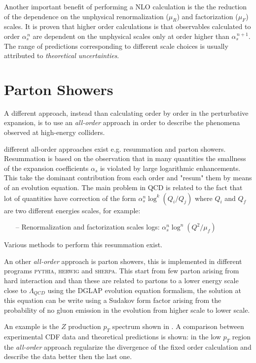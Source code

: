 Another important benefit of performing a NLO calculation is the the reduction of the dependence on the unphysical renormalization ($\mu_R$) and factorization ($\mu_F$) scales.
It is proven that higher order calculations is that observables calculated to order $\alpha_s^{\,n}$ are dependent on the unphysical scales only at order higher than $\alpha_s^{\,n+1}$. The range of predictions corresponding to different scale choices is usually attributed to \textit{theoretical uncertainties}.

\section{Parton Showers}

A different approach, instead than calculating order by order in the perturbative expansion, is to use an \textit{all-order} approach in order to describe the phenomena observed at high-energy colliders. 

different all-order approaches exist e.g. resummation and parton showers. Resummation is based on the observation that in many quantities the smallness of the expansion coefficients $\alpha_s$ is violated by large logarithmic enhancements. This take the dominant contribution from each order and "resum" them by means of an evolution equation. 
The main problem in QCD is related to the fact that lot of quantities have correction of the form $\alpha_s^n\log^k(Q_i/Q_j)$ where $Q_i$ and $Q_f$ are two different energies scales, for example:
\begin{itemize}
	\item[--] Renormalization and factorization scales logs: $\alpha_s^n\log^n(Q^2/\mu_f)$
\end{itemize}
Various methods to perform this resummation exist.


An other \textit{all-order} approach is parton showers, this is implemented in different programs  \textsc{pythia}, \textsc{herwig} and \textsc{sherpa}. This start from few parton arising from hard interaction and than these are related to partons to a lower energy scale close to $\Lambda_{QCD}$ using the DGLAP evolution equation formalism, the solution at this equation can be write using a Sudakov form factor arising from the probability of no gluon emission in the evolution from higher scale to lower scale.




An example is the $Z$ production $p_T$ spectrum shown in . A comparison between experimental CDF data and theoretical predictions is shown: in the low $p_T$ region the \textit{all-order} approach regularize the divergence of the fixed order calculation and describe the data better then the last one. 

